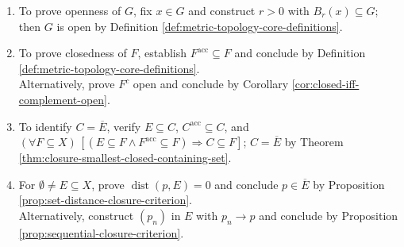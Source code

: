 \begin{proofmethod} \label{meth:metric-topology-proof-patterns} 
\begin{enumerate}[label=(\roman*)]
\setlength{\itemsep}{0pt}
\item To prove openness of $G$, fix $x\in G$ and construct $r>0$ with $B_r(x)\subseteq G$; then $G$ is open by Definition \ref{def:metric-topology-core-definitions}.
\item To prove closedness of $F$, establish $F^{\operatorname{acc}}\subseteq F$ and conclude by Definition \ref{def:metric-topology-core-definitions}.\\
Alternatively, prove $F^c$ open and conclude by Corollary \ref{cor:closed-iff-complement-open}.
\item To identify $C=\overline{E}$, verify $E\subseteq C$, $C^{\operatorname{acc}}\subseteq C$, and $(\forall F\subseteq X)\,[(E\subseteq F\land F^{\operatorname{acc}}\subseteq F)\Longrightarrow C\subseteq F]$; $C=\overline{E}$ by Theorem \ref{thm:closure-smallest-closed-containing-set}.
\item For $\emptyset\ne E\subseteq X$, prove $\operatorname{dist}(p,E)=0$ and conclude $p\in\overline{E}$ by Proposition \ref{prop:set-distance-closure-criterion}.\\
Alternatively, construct $(p_n)$ in $E$ with $p_n\to p$ and conclude by Proposition \ref{prop:sequential-closure-criterion}.
\end{enumerate}
\end{proofmethod}

